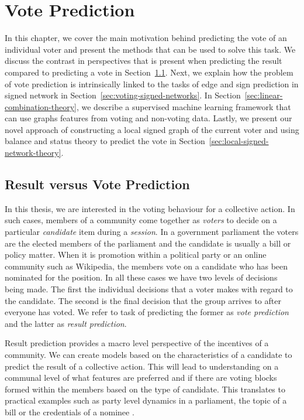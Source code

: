 \chapter{Vote Prediction}
\label{chp:vote-prediction}
In this chapter, we cover the main motivation behind predicting the vote of an individual voter and present the methods that can be used to solve this task. We discuss the contrast in perspectives that is present when predicting the result compared to predicting a vote in Section~\ref{sec:result-vs-vote}. Next, we explain how the problem of vote prediction is intrinsically linked to the tasks of edge and sign prediction in signed network in Section~\ref{sec:voting-signed-networks}. In Section~\ref{sec:linear-combination-theory}, we describe a supervised machine learning framework that can use graphs features from voting and non-voting data. Lastly, we present our novel approach of constructing a local signed graph of the current voter and using balance and status theory to predict the vote in Section~\ref{sec:local-signed-network-theory}. 


\section{Result versus Vote Prediction}
\label{sec:result-vs-vote}
In this thesis, we are interested in the voting behaviour for a collective action. In such cases, members of a community come together as \textit{voters} to decide on a particular \textit{candidate} item during a \textit{session}. In a government parliament  the voters are the elected members of the parliament and the candidate is usually a bill or policy matter. When it is promotion within a political party or an online community such as Wikipedia, the members vote on a candidate who has been nominated for the position. In all these cases we have two levels of decisions being made. The first the individual decisions that a voter makes with regard to the candidate. The second is the final decision that the group arrives to after everyone has voted. We refer to task of predicting the former as \textit{vote prediction} and the latter as \textit{result prediction}. 

Result prediction provides a macro level perspective of the incentives of a community. We can create models based on the characteristics of a candidate to predict the result of a collective action. This will lead to understanding on a communal level of what features are preferred and if there are voting blocks formed within the members based on the type of candidate. This translates to practical examples such as party level dynamics in a parliament, the topic of a bill or the credentials of a nominee \cite{burke2008mopping,yano2012textual,yogatama-etal-2011-predicting}. 

